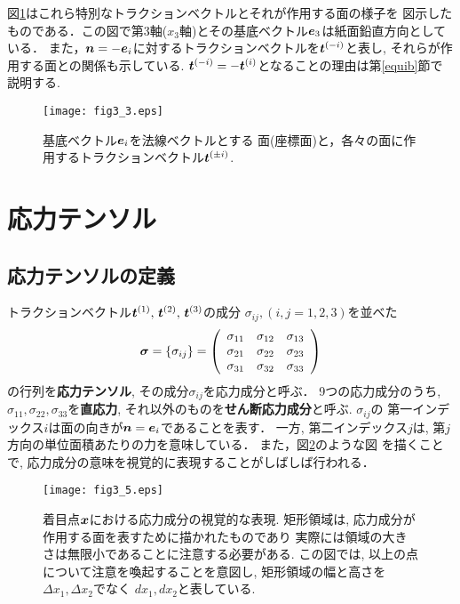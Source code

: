 \documentclass[10pt,a4j]{jbook}
\begin{document}
図\ref{fig:fig3_3}はこれら特別なトラクションベクトルとそれが作用する面の様子を
図示したものである．この図で第3軸($x_3$軸)とその基底ベクトル$\mbox{\boldmath $e$}_3$は紙面鉛直方向としている．
また，$\mbox{\boldmath $n$}=-\mbox{\boldmath $e$}_i$に対するトラクションベクトルを$\mbox{\boldmath $t$}^{(-i)}$と表し, 
それらが作用する面との関係も示している.
$\mbox{\boldmath $t$}^{(-i)}=-\mbox{\boldmath $t$}^{(i)}$となることの理由は第\ref{equib}節で説明する.
\begin{figure}[h]
	\begin{center}
	\texttt{[image: fig3\_3.eps]} 
	\end{center}
	\caption{基底ベクトル$\mbox{\boldmath $e$}_i$を法線ベクトルとする
	面(座標面)と，各々の面に作用するトラクションベクトル$\mbox{\boldmath $t$}^{(\pm i)}$.}
	\label{fig:fig3_3}
\end{figure}
\section{応力テンソル}
\subsection{応力テンソルの定義}
トラクションベクトル$\mbox{\boldmath $t$}^{(1)},\, \mbox{\boldmath $t$}^{(2)},\,\mbox{\boldmath $t$}^{(3)}$の成分
$\sigma_{ij},(i,j=1,2,3)$を並べた
\begin{equation}
	\mbox{\boldmath $\sigma$}=\left\{ \sigma_{ij}\right\}
	=\left(
	\begin{array}{ccc}
		\sigma_{11} & \sigma_{12} & \sigma_{13} \\
		\sigma_{21} & \sigma_{22} & \sigma_{23} \\
		\sigma_{31} & \sigma_{32} & \sigma_{33} 
	\end{array}
	\right)
\end{equation}
の行列を{\rm \bf 応力テンソル}, その成分$\sigma_{ij}$を応力成分と呼ぶ．
9つの応力成分のうち, $\sigma_{11},\sigma_{22},\sigma_{33}$を{\rm\bf 直応力}, 
それ以外のものを{\bf \rm せん断応力成分}と呼ぶ. $\sigma_{ij}$の
第一インデックス$i$は面の向きが$\mbox{\boldmath $n$}=\mbox{\boldmath $e$}_i$であることを表す．
一方, 第二インデックス$j$は, 第$j$方向の単位面積あたりの力を意味している．
また，図\ref{fig:fig3_5}のような図
を描くことで, 応力成分の意味を視覚的に表現することがしばしば行われる．
\begin{figure}[h]
	\begin{center}
	\texttt{[image: fig3\_5.eps]} 
	\end{center}
	\caption{着目点$\mbox{\boldmath $x$}$における応力成分の視覚的な表現.
	矩形領域は, 応力成分が作用する面を表すために描かれたものであり
	実際には領域の大きさは無限小であることに注意する必要がある.
	この図では, 以上の点について注意を喚起することを意図し, 
	矩形領域の幅と高さを$\Delta x_1, \Delta x_2$でなく
	$dx_1, dx_2$と表している. }
	\label{fig:fig3_5}
\end{figure}
\end{document}
